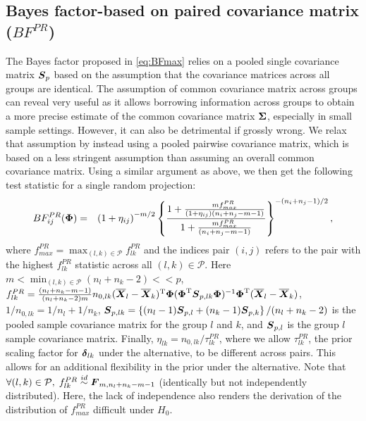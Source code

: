 \documentclass[times,sort&compress,3p]{elsarticle}
\theoremstyle{plain}%
\theoremstyle{definition}
\def\be{\begin{eqnarray}}
\def\ee{\end{eqnarray}}
\def\trans{^{\rm T}}
\newcommand{\uF}       {\mbox{\boldmath$F$}}
\newcommand{\uS}       {\mbox{\boldmath$S$}}
\newcommand{\uX}       {\mbox{\boldmath$X$}}
\newcommand{\udelta}            {\mbox{\boldmath$\delta$}}
\newcommand{\uSigma}            {\mbox{\boldmath$\Sigma$}}
\newcommand{\uPhi}              {\mbox{\boldmath$\Phi$}}
\begin{document}
\subsection{Bayes factor-based on paired covariance matrix ($BF^{PR}_{}$)} \label{sec:testid}
The Bayes factor proposed in \eqref{eq:BFmax} relies on a pooled single covariance matrix $\uS_p$ based on the assumption that the covariance matrices across all groups are identical. The assumption of common covariance matrix across groups can reveal very useful as it allows borrowing information across groups to obtain a more precise estimate of the common covariance matrix $\uSigma$, especially in small sample settings. However, it can also be detrimental if grossly wrong. We relax that assumption by instead using a pooled pairwise covariance matrix, which is based on a less stringent assumption than assuming an overall common covariance matrix. Using a similar argument as above, we then get the following test statistic for a single random projection:
\be
BF^{PR}_{ij}(\uPhi) &=& \left(1 + \eta_{ij} \right)^{-m/2} \left\{ \frac{1 + \frac{m f^{PR}_{max}}{(1 + \eta_{ij})(n_{i}+n_{j}-m-1)}}{ 1 + \frac{m f^{PR}_{max}}{(n_{i}+n_{j}-m-1)}  } \right\}^{-(n_{i}+n_{j}-1)/2}, \label{eq:BFmaxij}
\ee
where
 {\color{red}
$
f^{PR}_{max} = \max_{(l, k)\in\mathcal{P}}f^{PR}_{lk}
$
} and the indices pair $(i,j)$ refers to the pair with the highest $f^{PR}_{lk}$ statistic across all $(l, k)\in\mathcal{P}$.
Here $m < \min_{(l, k)\in\mathcal{P}}(n_{l}+n_{k} - 2) << p$,
$f^{PR}_{lk}  = \frac{(n_{l}+n_{k} - m - 1)}{(n_{l}+n_{k} -2)m} n_{0,lk} (\overline{\uX}_l - \overline{\uX}_k)\trans\uPhi (\uPhi\trans\uS_{p,lk}\uPhi)^{-1}\uPhi\trans(\overline{\uX}_l - \overline{\uX}_k)$,
$1/n_{0,lk} = 1/n_l + 1/n_k$, $\uS_{p,lk} =\left\{ (n_{l}-1)\uS_{p,l} + (n_{k}-1)\uS_{p,k} \right\}/(n_{l} + n_{k} -2)$ is the pooled sample covariance matrix for the group $l$ and $k$, 
and $\uS_{p,l}$ is the group $l$ sample covariance matrix.
Finally, $\eta_{lk} = n_{0,lk} /\tau^{PR}_{lk}$, where we allow $\tau^{PR}_{lk}$, the prior scaling factor for $\udelta_{lk}$ under the alternative, to be different across pairs. This allows for an additional flexibility in the prior under the alternative.  
Note that $\forall (l,k) \in \mathcal{P}, \; f^{PR}_{lk} \stackrel{id}{\sim} \uF_{m, n_{l}+n_{k} - m- 1}$ (identically but not independently distributed). Here, the lack of independence also renders the derivation of the distribution of $f^{PR}_{max}$ difficult under $H_0$. %
\end{document}
